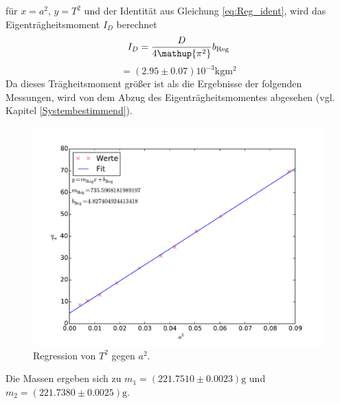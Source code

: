 für $x=a^2$, $y=T^2$ und der Identität aus Gleichung \eqref{eq:Reg_ident}, wird das Eigenträgheitsmoment $I_D$ berechnet
\begin{equation*}
	I_D= \frac{D}{4\mathup{\pi^2}}b_{\text{Reg}}\\
\end{equation*}
\begin{equation}
	\label{wert:eigentragheit}
	= (2.95\pm0.07)10^{-3} \si{\kilo\gram\meter\squared}
\end{equation}
Da dieses Trägheitsmoment größer ist als die Ergebnisse der folgenden Messungen, wird von dem Abzug des Eigenträgheitsmomentes abgesehen (vgl. Kapitel \ref{Systembestimmend}). 
\begin{figure}[hp]
	\centering
	\label{fig:Regress}
	\includegraphics[width=\textwidth]{Bilder/Messung2.pdf}
	\caption{Regression von $T^2$ gegen $a^2$.}
\end{figure}
Die Massen ergeben sich zu $m_1=(221.7510\pm0.0023)\si{\gram}$ und $m_2= (221.7380\pm0.0025)\si{\gram}$.

\newpage
